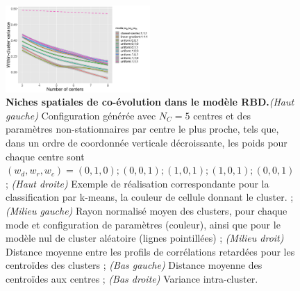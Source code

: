 \documentclass[11pt]{article}
\begin{document}
\begin{figure}
	\includegraphics[width=0.49\textwidth]{figures/withinss.png}
	\caption{\textbf{Niches spatiales de co-évolution dans le modèle RBD.}\textit{(Haut gauche)} Configuration générée avec $N_C = 5$ centres et des paramètres non-stationnaires par centre le plus proche, tels que, dans un ordre de coordonnée verticale décroissante, les poids pour chaque centre sont $(w_d,w_r,w_c) = (0,1,0) ; (0,0,1) ; (1,0,1) ; (1,0,1) ; (0,0,1)$ ; \textit{(Haut droite)} Exemple de réalisation correspondante pour la classification par k-means, la couleur de cellule donnant le cluster. ; \textit{(Milieu gauche)} Rayon normalisé moyen des clusters, pour chaque mode et configuration de paramètres (couleur), ainsi que pour le modèle nul de cluster aléatoire (lignes pointillées) ; \textit{(Milieu droit)} Distance moyenne entre les profils de corrélations retardées pour les centroïdes des clusters ; \textit{(Bas gauche)} Distance moyenne des centroïdes aux centres ; \textit{(Bas droite)} Variance intra-cluster.}
	\label{fig:rbd}
\end{figure}

 
 
\end{document}

